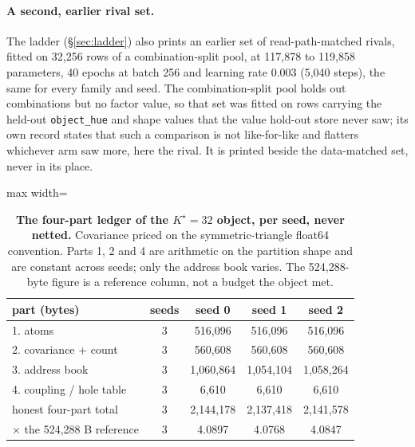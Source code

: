 \documentclass{article} %
\newcommand{\Kstar}{\ensuremath{K^{\star}}}
\begin{document}
\paragraph{A second, earlier rival set.} The ladder (\S\ref{sec:ladder}) also prints an earlier set
of read-path-matched rivals, fitted on 32,256 rows of a combination-split pool, at 117,878 to %
119,858 parameters, 40 epochs at batch 256 and learning rate 0.003 (5,040 steps), the same for %
every family and seed. %
The combination-split pool holds out combinations but no factor value, so that set was fitted on
rows carrying the held-out \texttt{object\_hue} and shape values that the value hold-out store never
saw; its own record states that such a comparison is not like-for-like and flatters whichever arm
saw more, here the rival. It is printed beside the data-matched set, never in its place.

\begin{table}[t]
\centering\small
\caption{\textbf{The four-part ledger of the $\Kstar=32$ object, per seed, never netted.}
Covariance priced on the symmetric-triangle float64 convention. Parts 1, 2 and 4 are
arithmetic on the partition shape and are constant across seeds; only the address book varies.
The 524,288-byte figure is a reference column, not a budget the object met.}
\label{tab:ledger-kstar}
\begin{adjustbox}{max width=\linewidth}\begin{tabular}{lcccc}
\toprule
part (bytes) & seeds & seed 0 & seed 1 & seed 2 \\
\midrule
1. atoms & 3 & 516,096 & 516,096 & 516,096 \\
2. covariance + count & 3 & 560,608 & 560,608 & 560,608 \\
3. address book & 3 & 1,060,864 & 1,054,104 & 1,058,264 \\
4. coupling / hole table & 3 & 6,610 & 6,610 & 6,610 \\
honest four-part total & 3 & 2,144,178 & 2,137,418 & 2,141,578 \\
$\times$ the 524,288 B reference & 3 & 4.0897 & 4.0768 & 4.0847 \\ %
\bottomrule
\end{tabular}\end{adjustbox}
\end{table}
\end{document}
